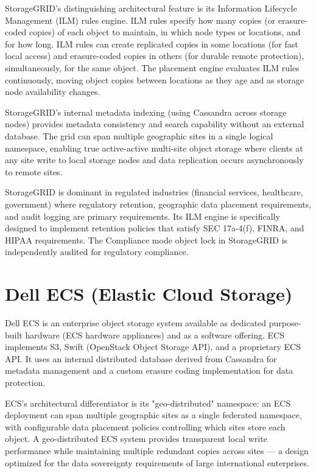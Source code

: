 StorageGRID's distinguishing architectural feature is its Information Lifecycle Management (ILM) rules engine. ILM rules specify how many copies (or erasure-coded copies) of each object to maintain, in which node types or locations, and for how long. ILM rules can create replicated copies in some locations (for fast local access) and erasure-coded copies in others (for durable remote protection), simultaneously, for the same object. The placement engine evaluates ILM rules continuously, moving object copies between locations as they age and as storage node availability changes.

StorageGRID's internal metadata indexing (using Cassandra across storage nodes) provides metadata consistency and search capability without an external database. The grid can span multiple geographic sites in a single logical namespace, enabling true active-active multi-site object storage where clients at any site write to local storage nodes and data replication occurs asynchronously to remote sites.

StorageGRID is dominant in regulated industries (financial services, healthcare, government) where regulatory retention, geographic data placement requirements, and audit logging are primary requirements. Its ILM engine is specifically designed to implement retention policies that satisfy SEC 17a-4(f), FINRA, and HIPAA requirements. The Compliance mode object lock in StorageGRID is independently audited for regulatory compliance.

\section{Dell ECS (Elastic Cloud Storage)}
Dell ECS is an enterprise object storage system available as dedicated purpose-built hardware (ECS hardware appliances) and as a software offering. ECS implements S3, Swift (OpenStack Object Storage API), and a proprietary ECS API. It uses an internal distributed database derived from Cassandra for metadata management and a custom erasure coding implementation for data protection.

ECS's architectural differentiator is its "geo-distributed" namespace: an ECS deployment can span multiple geographic sites as a single federated namespace, with configurable data placement policies controlling which sites store each object. A geo-distributed ECS system provides transparent local write performance while maintaining multiple redundant copies across sites --- a design optimized for the data sovereignty requirements of large international enterprises.

